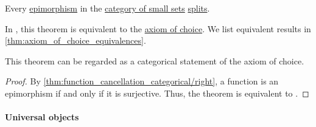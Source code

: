 \begin{theorem}\label{thm:epimorphisms_split_in_set}
  Every \hyperref[def:morphism_cancellation/right]{epimorphism} in the \hyperref[def:category_of_small_sets]{category of small sets} \hyperref[def:morphism_invertibility/left]{splits}.
\end{theorem}
\begin{comments}
  \item In \hyperref[def:axiom_of_universes]{}, this theorem is equivalent to the \hyperref[def:zfc/choice]{axiom of choice}. We list equivalent results in \cref{thm:axiom_of_choice_equivalences}.

  This theorem can be regarded as a categorical statement of the axiom of choice.
\end{comments}
\begin{proof}
  By \cref{thm:function_cancellation_categorical/right}, a function is an epimorphism if and only if it is surjective. Thus, the theorem is equivalent to .
\end{proof}

\paragraph{Universal objects}

